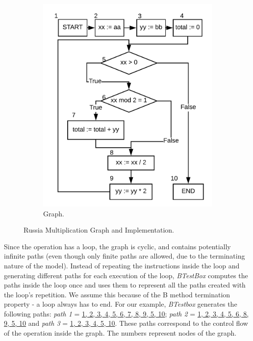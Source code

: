 \documentclass[runningheads]{llncs}
\begin{document}
\begin{figure}
\begin{minipage}{0.45\textwidth}
\begin{subfigure}{\textwidth}
\includegraphics[width = \textwidth]{imagens/lacoGrafo.png}
\caption{Graph.}
\label{fig:russianMultGraph}
\end{subfigure}
\end{minipage}
\caption{Russia Multiplication Graph and Implementation.}
\end{figure}
Since the operation has a loop, the graph is cyclic, and contains potentially infinite paths (even though only finite paths are allowed, due to the terminating nature of the model). 
Instead of repeating the instructions inside the loop and generating different paths for each execution of the loop, \textit{BTestBox} computes the paths inside the loop once and uses them to represent all the paths created with the loop's repetition. 
We assume this because of the B method termination property - a loop always has to end.
For our example, \textit{BTestbox} generates the following paths: \textit{path 1} = \ul{1, 2, 3, 4, 5, 6, 7, 8, 9, 5, 10};  \textit{path 2} = \ul{1, 2, 3, 4, 5, 6, 8, 9, 5, 10} and \textit{path 3} = \ul{1, 2, 3, 4, 5, 10}.
These paths correspond to the control flow of the operation inside the graph. The numbers represent nodes of the graph.
\end{document}
